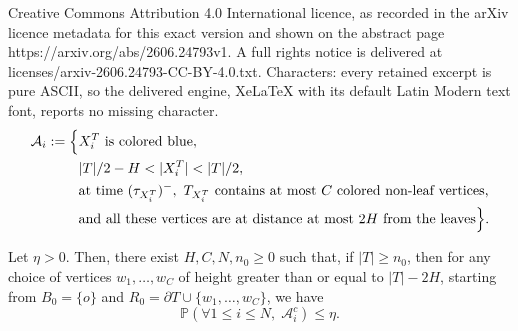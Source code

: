 \documentclass[10pt,a4paper]{amsart}
\newcommand{\Tf}{T}
\renewcommand{\P}{\mathbb{P}}
\begin{document}
Creative Commons Attribution 4.0 International licence, as recorded in the arXiv licence metadata for this exact version and shown on the abstract page https://arxiv.org/abs/2606.24793v1. A full rights notice is delivered at licenses/arxiv-2606.24793-CC-BY-4.0.txt. Characters: every retained excerpt is pure ASCII, so the delivered engine, XeLaTeX with its default Latin Modern text font, reports no missing character.
\begin{equation}\label{eq:defai}
\begin{aligned}
\mathcal{A}_i := \Bigl\{&
X^{\Tf}_i \text{ is colored blue},\\
& |\Tf|/2 - H < |X^{\Tf}_i| < |\Tf|/2,\\
& \text{at time }(\tau_{X^{\Tf}_i})^{-},\ 
\Tf_{X^{\Tf}_i} \text{ contains at most } C \text{ colored non-leaf vertices,}\\
& \text{and all these vertices are at distance at most } 2H \text{ from the leaves}
\Bigr\}.
\end{aligned}
\end{equation}

\begin{prop}\label{prop:unsommetvide} Let $\eta>0$. Then, there exist $H,C,N,n_0\ge 0$ such that, if $|\Tf|\ge n_0$, then for any choice of vertices $w_1,\ldots,w_C$ of height greater than or equal to $|\Tf|-2H$, starting from $B_0=\{o\}$ and $R_0=\partial \Tf \cup\{w_1,\ldots,w_C\}$, we have
\begin{equation*}
 \P(\forall 1\le i\le N,\; \mathcal{A}_i^c)\le \eta.
\end{equation*}
\end{prop}
\end{document}

